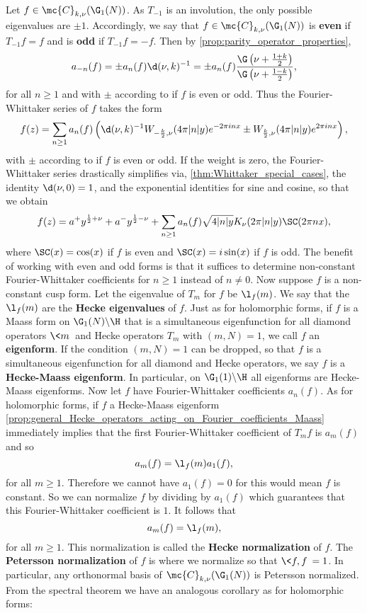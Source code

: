     Let $f \in \mc{C}_{k,\nu}(\G_{1}(N))$. As $T_{-1}$ is an involution, the only possible eigenvalues are $\pm 1$. Accordingly, we say that $f \in \mc{C}_{k,\nu}(\G_{1}(N))$ is \textbf{even} if $T_{-1}f = f$ and is \textbf{odd} if $T_{-1}f = -f$. Then by \cref{prop:parity_operator_properties},
    \[
      a_{-n}(f) = \pm a_{n}(f)\d(\nu,k)^{-1} = \pm a_{n}(f)\frac{\G\left(\nu+\frac{1+k}{2}\right)}{\G\left(\nu+\frac{1-k}{2}\right)},
    \]
    for all $n \ge 1$ and with $\pm$ according to if $f$ is even or odd. Thus the Fourier-Whittaker series of $f$ takes the form
    \[
      f(z) = \sum_{n \ge 1}a_{n}(f)\left(\d(\nu,k)^{-1}W_{-\frac{k}{2},\nu}(4\pi |n|y)e^{-2\pi inx}\pm W_{\frac{k}{2},\nu}(4\pi |n|y)e^{2\pi inx}\right),
    \]
    with $\pm$ according to if $f$ is even or odd. If the weight is zero, the Fourier-Whittaker series drastically simplifies via, \cref{thm:Whittaker_special_cases}, the identity $\d(\nu,0) = 1$, and the exponential identities for sine and cosine, so that we obtain
    \[
      f(z) = a^{+}y^{\frac{1}{2}+\nu}+a^{-}y^{\frac{1}{2}-\nu}+\sum_{n \ge 1}a_{n}(f)\sqrt{4|n|y}K_{\nu}(2\pi |n|y)\SC(2\pi nx),
    \]
    where $\SC(x) = \cos(x)$ if $f$ is even and $\SC(x) = i\sin(x)$ if $f$ is odd. The benefit of working with even and odd forms is that it suffices to determine non-constant Fourier-Whittaker coefficients for $n \ge 1$ instead of $n \neq 0$. Now suppose $f$ is a non-constant cusp form. Let the eigenvalue of $T_{m}$ for $f$ be $\l_{f}(m)$. We say that the $\l_{f}(m)$ are the \textbf{Hecke eigenvalues} of $f$. Just as for holomorphic forms, if $f$ is a Maass form on $\G_{1}(N)\backslash\H$ that is a simultaneous eigenfunction for all diamond operators $\<m\>$ and Hecke operators $T_{m}$ with $(m,N) = 1$, we call $f$ an \textbf{eigenform}. If the condition $(m,N) = 1$ can be dropped, so that $f$ is a simultaneous eigenfunction for all diamond and Hecke operators, we say $f$ is a \textbf{Hecke-Maass eigenform}. In particular, on $\G_{1}(1)\backslash\H$ all eigenforms are Hecke-Maass eigenforms. Now let $f$ have Fourier-Whittaker coefficients $a_{n}(f)$. As for holomorphic forms, if $f$ a Hecke-Maass eigenform \cref{prop:general_Hecke_operators_acting_on_Fourier_coefficients_Maass} immediately implies that the first Fourier-Whittaker coefficient of $T_{m}f$ is $a_{m}(f)$ and so
    \[
      a_{m}(f) = \l_{f}(m)a_{1}(f),
    \]
    for all $m \ge 1$. Therefore we cannot have $a_{1}(f) = 0$ for this would mean $f$ is constant. So we can normalize $f$ by dividing by $a_{1}(f)$ which guarantees that this Fourier-Whittaker coefficient is $1$. It follows that
    \[
      a_{m}(f) = \l_{f}(m),
    \]
    for all $m \ge 1$. This normalization is called the \textbf{Hecke normalization} of $f$. The \textbf{Petersson normalization} of $f$ is where we normalize so that $\<f,f\> = 1$. In particular, any orthonormal basis of $\mc{C}_{k,\nu}(\G_{1}(N))$ is Petersson normalized. From the spectral theorem we have an analogous corollary as for holomorphic forms:

